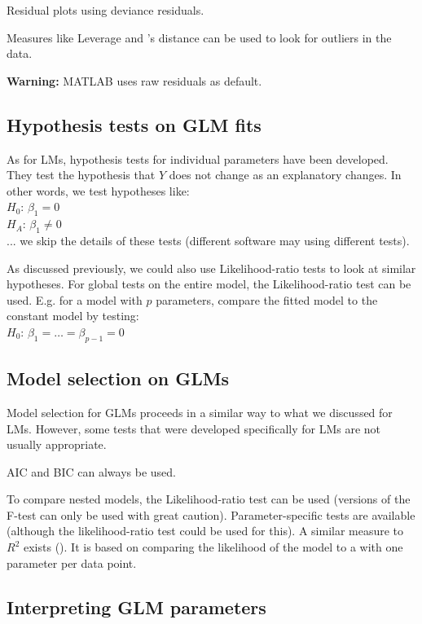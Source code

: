 Residual plots using deviance residuals.




Measures like Leverage and 's distance can be used to look for outliers in the data.

\textbf{Warning:} MATLAB uses raw residuals as default.

\subsection{Hypothesis tests on GLM fits}

As for LMs, hypothesis tests for individual parameters have been developed. They test the hypothesis that $Y$ does not change as an explanatory changes. In other words, we test hypotheses like: \\
$H_0$: $\beta_1=0$ \\
$H_A$: $\beta_1\neq 0$ \\
... we skip the details of these tests (different software may using different tests).

As discussed previously, we could also use Likelihood-ratio tests to look at similar hypotheses. For global tests on the entire model, the Likelihood-ratio test can be used. E.g. for a model with $p$ parameters, compare the fitted model to the constant model by testing: \\
$H_0$: $\beta_1=\dots=\beta_{p-1}=0$

\subsection{Model selection on GLMs}

Model selection for GLMs proceeds in a similar way to what we discussed for LMs. However, some tests that were developed specifically for LMs are not usually appropriate.

AIC and BIC can always be used.

To compare nested models, the Likelihood-ratio test can be  used (versions of the F-test can only be used with great caution). Parameter-specific tests are available (although the likelihood-ratio test could be used for this). A similar measure to $R^2$ exists (). It is based on comparing the likelihood of the model to a  with one parameter per data point.

\subsection{Interpreting GLM parameters}

